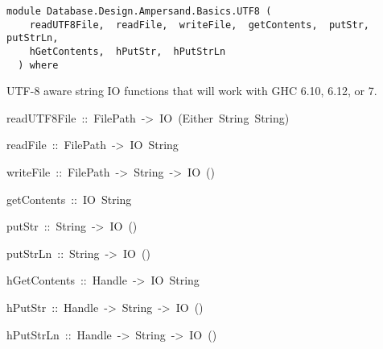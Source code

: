 \label{module:Database.Design.Ampersand.Basics.UTF8}
\haddockbeginheader
{\haddockverb\begin{verbatim}
module Database.Design.Ampersand.Basics.UTF8 (
    readUTF8File,  readFile,  writeFile,  getContents,  putStr,  putStrLn, 
    hGetContents,  hPutStr,  hPutStrLn
  ) where\end{verbatim}}
\haddockendheader

UTF-8 aware string IO functions that will work with GHC 6.10, 6.12, or 7.
\par

\begin{haddockdesc}
\item[
readUTF8File\ ::\ FilePath\ ->\ IO\ (Either\ String\ String)
]
\item[
readFile\ ::\ FilePath\ ->\ IO\ String
]
\item[
writeFile\ ::\ FilePath\ ->\ String\ ->\ IO\ ()
]
\item[
getContents\ ::\ IO\ String
]
\item[
putStr\ ::\ String\ ->\ IO\ ()
]
\item[
putStrLn\ ::\ String\ ->\ IO\ ()
]
\item[
hGetContents\ ::\ Handle\ ->\ IO\ String
]
\item[
hPutStr\ ::\ Handle\ ->\ String\ ->\ IO\ ()
]
\item[
hPutStrLn\ ::\ Handle\ ->\ String\ ->\ IO\ ()
]
\end{haddockdesc}
